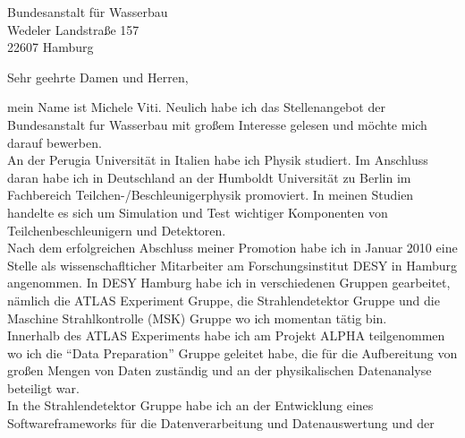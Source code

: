\documentclass[ebner,paper=a4,fontsize=11pt,ngerman,BCOR=10mm]{scrlttr2}%
\begin{document}
\pagestyle{empty}

\begin{letter}{Bundesanstalt f\"ur Wasserbau\\
Wedeler Landstra{\ss}e 157\\ 
22607 Hamburg}


\setlength{\parindent}{15pt}

\opening{Sehr geehrte Damen und Herren,} 

mein Name ist Michele Viti. Neulich habe
ich das Stellenangebot der Bundesanstalt f{u}r Wasserbau mit gro{\ss}em
Interesse gelesen und m{\"o}chte mich darauf bewerben. \\ 
% 
% 
% 
\indent An der Perugia Universit\"at in Italien habe ich Physik studiert. Im
Anschluss daran habe ich in Deutschland an der Humboldt Universit\"at
zu Berlin im Fachbereich Teilchen-/Beschleunigerphysik promoviert. In
meinen Studien handelte es sich um Simulation und Test wichtiger
Komponenten von Teilchenbeschleunigern und Detektoren.\\
\indent Nach dem erfolgreichen Abschluss meiner Promotion habe ich in Januar
2010 eine Stelle als wissenschaflticher Mitarbeiter am Forschungsinstitut DESY
in Hamburg angenommen. In DESY Hamburg habe ich in verschiedenen Gruppen
gearbeitet, n{\"a}mlich die ATLAS Experiment Gruppe, die Strahlendetektor Gruppe
und die Maschine Strahlkontrolle (MSK) Gruppe wo ich momentan t{\"a}tig bin. \\
Innerhalb des ATLAS Experiments habe ich am Projekt ALPHA teilgenommen wo
ich die "`Data Preparation"' Gruppe geleitet habe, die f{\"u}r die Aufbereitung
von gro{\ss}en Mengen von Daten zust{\"a}ndig und an der physikalischen
Datenanalyse beteiligt war.\\
In the Strahlendetektor Gruppe habe ich an der Entwicklung eines
Softwareframeworks f\"ur die Datenverarbeitung und Datenauswertung und der

\end{letter}
\end{document}
